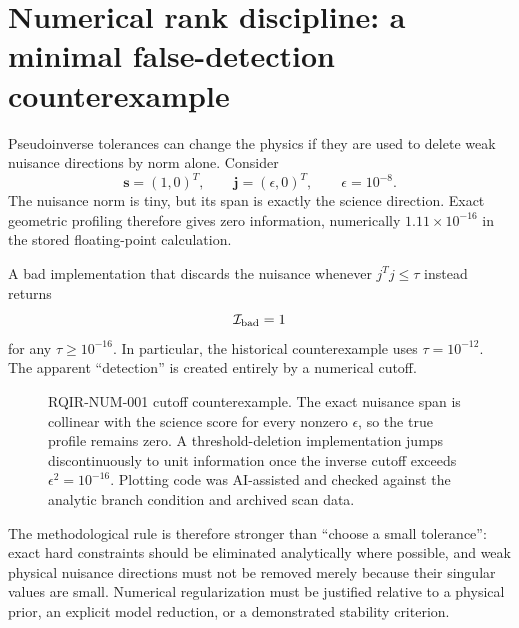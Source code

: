 \section{Numerical rank discipline: a minimal false-detection counterexample}
\label{sec:rank}

Pseudoinverse tolerances can change the physics if they are used to delete weak nuisance directions by norm alone. Consider
\begin{equation}
 \bm s=(1,0)^T,
 \qquad
 \bm j=(\epsilon,0)^T,
 \qquad \epsilon=10^{-8}.
\label{eq:cutoffcase}
\end{equation}
The nuisance norm is tiny, but its span is exactly the science direction. Exact geometric profiling therefore gives zero information, numerically $1.11\times10^{-16}$ in the stored floating-point calculation.

A bad implementation that discards the nuisance whenever $j^Tj\le\tau$ instead returns
\begin{equation}
 \mathcal I_{\rm bad}=1
\end{equation}
for any $\tau\ge10^{-16}$. In particular, the historical counterexample uses $\tau=10^{-12}$. The apparent ``detection'' is created entirely by a numerical cutoff.

\begin{figure}[t]
\centering

\caption{RQIR-NUM-001 cutoff counterexample. The exact nuisance span is collinear with the science score for every nonzero $\epsilon$, so the true profile remains zero. A threshold-deletion implementation jumps discontinuously to unit information once the inverse cutoff exceeds $\epsilon^2=10^{-16}$. Plotting code was AI-assisted and checked against the analytic branch condition and archived scan data.}
\label{fig:cutoff}
\end{figure}

The methodological rule is therefore stronger than ``choose a small tolerance'': exact hard constraints should be eliminated analytically where possible, and weak physical nuisance directions must not be removed merely because their singular values are small. Numerical regularization must be justified relative to a physical prior, an explicit model reduction, or a demonstrated stability criterion.

